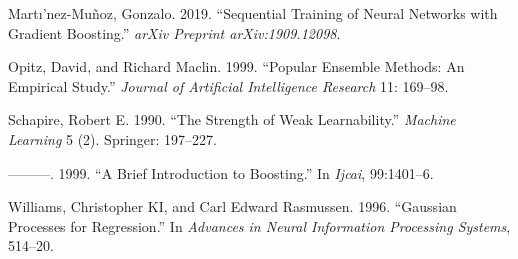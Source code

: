 \documentclass[
	12pt,				%
	a4paper,		%
	oneside,    %
	chapter=TITLE,		   %
	section=TITLE,		   %
	subsection=TITLE,	   %
	subsubsection=TITLE, %
	english,			%
	french,				%
	spanish,			%
	brazil,				%
]{abntex2}
\begin{document}
\leavevmode\hypertarget{ref-martinez2019sequential}{}%
Martı'nez-Muñoz, Gonzalo. 2019. ``Sequential Training of Neural Networks
with Gradient Boosting.'' \emph{arXiv Preprint arXiv:1909.12098}.

\leavevmode\hypertarget{ref-opitz1999popular}{}%
Opitz, David, and Richard Maclin. 1999. ``Popular Ensemble Methods: An
Empirical Study.'' \emph{Journal of Artificial Intelligence Research}
11: 169--98.

\leavevmode\hypertarget{ref-schapire1990strength}{}%
Schapire, Robert E. 1990. ``The Strength of Weak Learnability.''
\emph{Machine Learning} 5 (2). Springer: 197--227.

\leavevmode\hypertarget{ref-schapire1999brief}{}%
---------. 1999. ``A Brief Introduction to Boosting.'' In \emph{Ijcai},
99:1401--6.

\leavevmode\hypertarget{ref-williams1996gaussian}{}%
Williams, Christopher KI, and Carl Edward Rasmussen. 1996. ``Gaussian
Processes for Regression.'' In \emph{Advances in Neural Information
Processing Systems}, 514--20.

\postextual



\printindex
\end{document}
